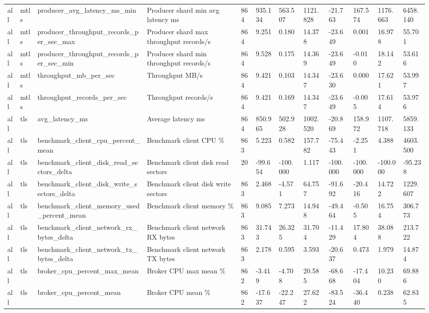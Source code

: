 \begin{longtable}{llllllllllll}
all & mtls & producer\_avg\_latency\_ms\_min & Producer shard min avg latency ms & 864 & 935.134 & 563.507 & 1121.828 & -21.763 & 167.574 & 1176.663 & 6458.140 \\
all & mtls & producer\_throughput\_records\_per\_sec\_max & Producer shard max throughput records/s & 864 & 9.251 & 0.180 & 14.378 & -23.649 & 0.001 & 16.978 & 55.701 \\
all & mtls & producer\_throughput\_records\_per\_sec\_min & Producer shard min throughput records/s & 864 & 9.528 & 0.175 & 14.369 & -23.649 & -0.010 & 18.142 & 53.616 \\
all & mtls & throughput\_mb\_per\_sec & Throughput MB/s & 864 & 9.421 & 0.103 & 14.347 & -23.630 & 0.000 & 17.621 & 53.997 \\
all & mtls & throughput\_records\_per\_sec & Throughput records/s & 864 & 9.421 & 0.169 & 14.347 & -23.649 & -0.005 & 17.614 & 53.976 \\
all & tls & avg\_latency\_ms & Average latency ms & 864 & 850.965 & 502.928 & 1002.520 & -20.869 & 158.972 & 1107.718 & 5859.133 \\
all & tls & benchmark\_client\_cpu\_percent\_mean & Benchmark client CPU \% & 863 & 5.223 & 0.582 & 157.782 & -75.443 & -2.251 & 4.388 & 4603.500 \\
all & tls & benchmark\_client\_disk\_read\_sectors\_delta & Benchmark client disk read sectors & 20 & -99.654 & -100.000 & 1.117 & -100.000 & -100.000 & -100.000 & -95.238 \\
all & tls & benchmark\_client\_disk\_write\_sectors\_delta & Benchmark client disk write sectors & 863 & 2.468 & -4.571 & 64.757 & -91.692 & -20.416 & 14.722 & 1229.607 \\
all & tls & benchmark\_client\_memory\_used\_percent\_mean & Benchmark client memory \% & 863 & 9.085 & 7.273 & 14.948 & -49.464 & -0.505 & 16.754 & 306.773 \\
all & tls & benchmark\_client\_network\_rx\_bytes\_delta & Benchmark client network RX bytes & 863 & 31.743 & 26.325 & 31.704 & -11.429 & 17.804 & 38.088 & 213.722 \\
all & tls & benchmark\_client\_network\_tx\_bytes\_delta & Benchmark client network TX bytes & 863 & 2.178 & 0.595 & 3.593 & -20.637 & 0.473 & 1.979 & 14.874 \\
all & tls & broker\_cpu\_percent\_max\_mean & Broker CPU max mean \% & 862 & -3.419 & -4.708 & 20.585 & -68.668 & -17.404 & 10.230 & 69.886 \\
all & tls & broker\_cpu\_percent\_mean & Broker CPU mean \% & 862 & -17.637 & -22.247 & 27.622 & -83.524 & -36.440 & 0.238 & 62.835 \\

\end{longtable}
